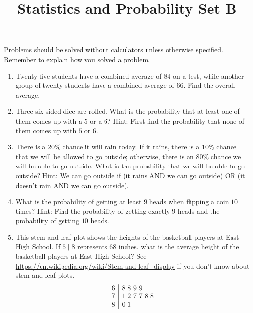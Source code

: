 \documentclass{article}
\title{Statistics and Probability Set B}
\author{}
\date{}
\begin{document}
\maketitle
\noindent Problems should be solved without calculators unless otherwise
specified.  Remember to explain how you solved a problem.
\begin{enumerate}
    \item Twenty-five students have a combined average of $84$ on a test, while
        another group of twenty students have a combined average of $66$. Find
        the overall average.
        \vspace{3cm}
    \item Three six-sided dice are rolled. What is the probability that at least
        one of them comes up with a $5$ or a $6$? Hint: First find the
        probability that none of them comes up with $5$ or $6$.
        \vspace{3cm}
    \item There is a $20\%$ chance it will rain today. If it rains, there is a
        $10\%$ chance that we will be allowed to go outside; otherwise, there is
        an $80\%$ chance we will be able to go outside. What is the probability
        that we will be able to go outside? Hint: We can go outside if (it rains
        AND we can go outside) OR (it doesn't rain AND we can go outside).
        \vspace{3cm}
    \item What is the probability of getting at least $9$ heads when flipping a
        coin $10$ times? Hint: Find the probability of getting exactly $9$ heads
        and the probability of getting $10$ heads.
        \vspace{3cm}
    \item This stem-and leaf plot shows the heights of the basketball players at
        East High School. If $6 \mid 8$ represents $68$ inches, what is the
        average height of the basketball players at East High School? See
        \url{https://en.wikipedia.org/wiki/Stem-and-leaf_display} if you don't
        know about stem-and-leaf plots.
        \[
            \begin{array}{r | l}
                6 & 8~8~9~9 \\
                7 & 1~2~7~7~8~8 \\
                8 & 0~1
            \end{array}
        \]
        \vspace{3cm}
\end{enumerate}
\end{document}
